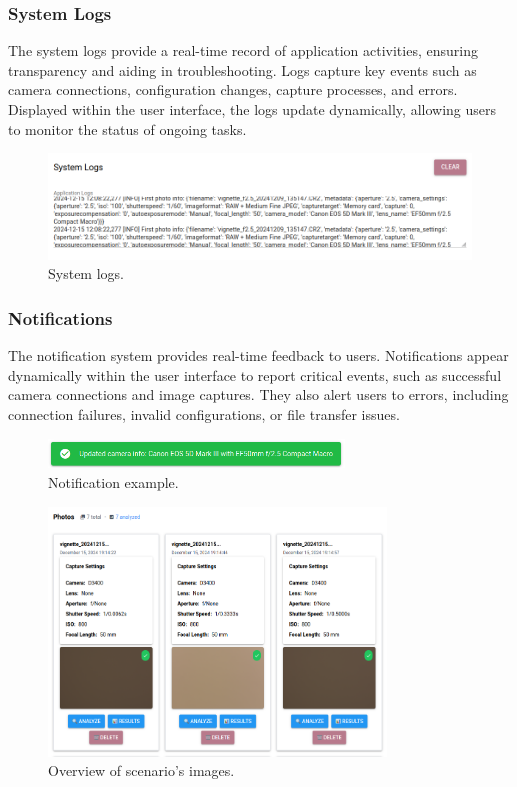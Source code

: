 \subsubsection{System Logs}
The system logs provide a real-time record of application activities, ensuring transparency and aiding in troubleshooting. Logs capture key events such as camera connections, configuration changes, capture processes, and errors. Displayed within the user interface, the logs update dynamically, allowing users to monitor the status of ongoing tasks.

\begin{figure}[h]
\centering
\includegraphics[width=1\textwidth]{Images/system_logs.png}
\caption{System logs.}
\label{fig:ui_system_logs}
\end{figure}

\subsubsection{Notifications}
The notification system provides real-time feedback to users. Notifications appear dynamically within the user interface to report critical events, such as successful camera connections and image captures. They also alert users to errors, including connection failures, invalid configurations, or file transfer issues.

\begin{figure}[h]
\centering
\includegraphics[width=0.7\textwidth]{Images/notification.png}
\caption{Notification example.}
\label{fig:ui_notification}
\end{figure}

\begin{figure}[hbt]
\centering
\includegraphics[width=0.8\textwidth]{Images/scenario_photos.png}
\caption{Overview of scenario's images.}
\label{fig:ui_scenario_images}
\end{figure}

